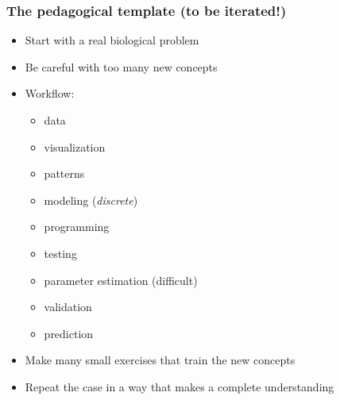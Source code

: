 \documentclass{beamer}
\begin{document}
\begin{frame}
\frametitle{The pedagogical template (to be iterated!)}

\begin{block}{}
\begin{itemize}
 \item Start with a real biological problem

 \item Be careful with too many new concepts

 \item Workflow:
\begin{itemize}

  \item data

  \item visualization

  \item patterns

  \item modeling (\emph{discrete})

  \item programming

  \item testing

  \item parameter estimation (difficult)

  \item validation

  \item prediction

\end{itemize}

\noindent
 \item Make many small exercises that train the new concepts

 \item Repeat the case in a way that makes a complete understanding
\end{itemize}

\noindent
\end{block}
\end{frame}
\end{document}
